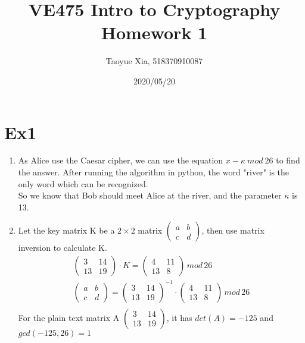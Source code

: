 \documentclass[12pt, a4paper]{article}
\begin{document}
\title{VE475 Intro to Cryptography Homework 1}
\author{Taoyue Xia, 518370910087}
\date{2020/05/20}
\maketitle

\section{Ex1}
\begin{enumerate}
\item As Alice use the Caesar cipher, we can use the equation $x-\kappa \  mod \  26$ to find the answer.
After running the algorithm in python, the word "river" is the only word which can be recognized.\\
So we know that Bob should meet Alice at the river, and the parameter $\kappa$ is 13.
\item Let the key matrix K be a $2\times 2$ matrix $\begin{pmatrix} a & b \\ c & d \end{pmatrix}$, 
then use matrix \\inversion to calculate K.\\
      \begin{equation*}
        \begin{split}
            \begin{pmatrix} 3 & 14 \\ 13 & 19 \end{pmatrix} \cdot K = \begin{pmatrix} 4 & 11 \\ 13 & 8 \end{pmatrix}\, mod\, 26\\
            \begin{pmatrix} a & b \\ c & d \end{pmatrix} = \begin{pmatrix} 3 & 14 \\ 13 & 19 \end{pmatrix}^{-1}
                \cdot \begin{pmatrix} 4 & 11 \\ 13 & 8 \end{pmatrix}\, mod\, 26\\
        \end{split}
      \end{equation*}  
      For the plain text matrix A $\begin{pmatrix} 3 & 14 \\ 13 & 19 \end{pmatrix}$, it has $det(A)=-125$ and $gcd(-125, 26) =1$\\

\end{enumerate}
\end{document}
